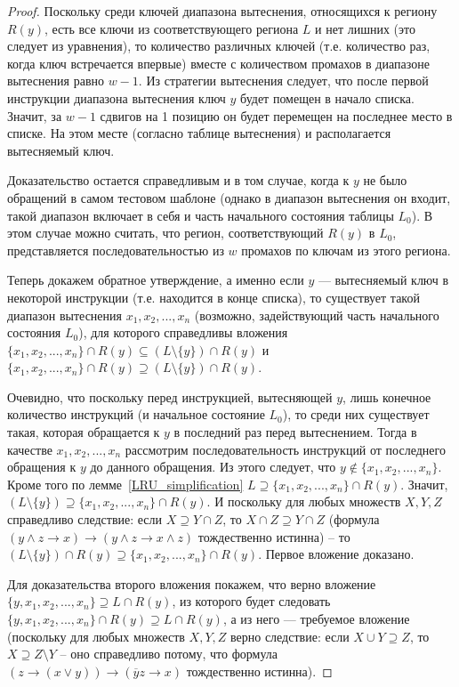 \begin{proof}
  Поскольку среди ключей диапазона вытеснения, относящихся к региону $R(y)$,
  есть все ключи из соответствующего региона $L$ и
  нет лишних (это следует из уравнения), то количество различных
  ключей (т.е. количество раз, когда ключ встречается впервые) вместе с
  количеством промахов в диапазоне вытеснения равно $w{-}1$. Из
  стратегии вытеснения следует, что после первой инструкции
  диапазона вытеснения ключ $y$ будет помещен в начало списка.
  Значит, за $w{-}1$ сдвигов на 1 позицию он будет перемещен на
  последнее место в списке. На этом месте (согласно таблице вытеснения)
  и располагается вытесняемый ключ.

  Доказательство остается справедливым и в том случае, когда к $y$
  не было обращений в самом тестовом шаблоне (однако в диапазон
  вытеснения он входит, такой диапазон включает в себя и часть
  начального состояния таблицы $L_0$). В этом случае
  можно считать, что регион, соответствующий $R(y)$ в $L_0$,
  представляется последовательностью из $w$ промахов по ключам из этого региона.

  Теперь докажем обратное утверждение, а именно если $y$ --- вытесняемый
  ключ в некоторой инструкции (т.е. находится в конце списка), то
  существует такой диапазон вытеснения $x_1, x_2, ..., x_n$
  (возможно, задействующий часть начального состояния $L_0$), для
  которого справедливы вложения $\{x_1, x_2, ..., x_n\} \cap R(y) \subseteq (L\setminus\{y\}) \cap R(y)$ и $\{x_1, x_2, ..., x_n\} \cap R(y) \supseteq(L\setminus\{y\}) \cap R(y)$.

  Очевидно, что поскольку перед инструкцией, вытесняющей $y$, лишь
  конечное количество инструкций (и начальное состояние $L_0$), то
  среди них существует такая, которая обращается к $y$ в последний
  раз перед вытеснением. Тогда в качестве $x_1, x_2, ..., x_n$
  рассмотрим последовательность инструкций от последнего обращения к
  $y$ до данного обращения. Из этого следует, что $y \notin \{x_1,
  x_2, ..., x_n\}$. Кроме того по лемме~\ref{LRU_simplification} $L
  \supseteq \{x_1, x_2, ..., x_n\} \cap R(y)$. Значит,
  $(L\setminus\{y\}) \supseteq \{x_1, x_2, ..., x_n\} \cap R(y)$. И
  поскольку для любых множеств $X, Y, Z$ справедливо следствие: если
  $X \supseteq Y \cap Z$, то $X\cap Z \supseteq Y \cap Z$ (формула
  $(y \wedge z \rightarrow x) \rightarrow (y \wedge z \rightarrow x
  \wedge z)$ тождественно истинна) -- то $(L\setminus\{y\}) \cap
  R(y) \supseteq \{x_1, x_2, ..., x_n\} \cap R(y)$. Первое вложение
  доказано.

  Для доказательства второго вложения покажем, что верно вложение\\
  $\{y, x_1, x_2, ..., x_n\} \supseteq L \cap R(y)$, из
  которого будет следовать\\ $\{y, x_1, x_2, ..., x_n\} \cap R(y) \supseteq L \cap R(y)$, а из него --- требуемое вложение (поскольку для любых
  множеств $X, Y, Z$ верно следствие: если $X \cup Y\supseteq Z$,
  то $X \supseteq Z \setminus Y$ -- оно справедливо потому, что
  формула $(z \rightarrow (x \vee y))\rightarrow(\overline{y}z\rightarrow x)$
  тождественно истинна).


\end{proof}
